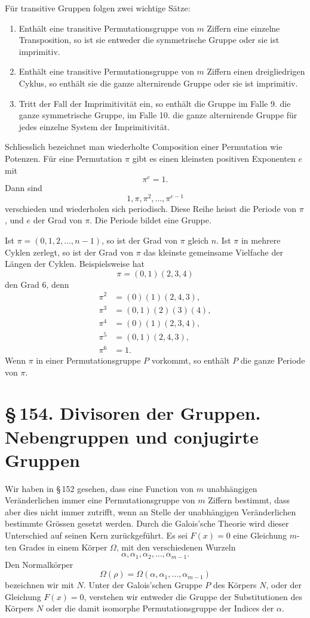 \documentclass[11pt]{article}
\providecommand{\sect}[2]{\section*{\S\,#1. #2}}
\begin{document}
Für transitive Gruppen folgen zwei wichtige Sätze:
\begin{enumerate}[label=\arabic*.,leftmargin=2em,start=9]
\item Enthält eine transitive Permutationsgruppe von $m$ Ziffern eine einzelne Transposition, so ist sie entweder die symmetrische Gruppe oder sie ist imprimitiv.
\item Enthält eine transitive Permutationsgruppe von $m$ Ziffern einen dreigliedrigen Cyklus, so enthält sie die ganze alternirende Gruppe oder sie ist imprimitiv.
\item Tritt der Fall der Imprimitivität ein, so enthält die Gruppe im Falle 9. die ganze symmetrische Gruppe, im Falle 10. die ganze alternirende Gruppe für jedes einzelne System der Imprimitivität.
\end{enumerate}

Schliesslich bezeichnet man wiederholte Composition einer Permutation wie Potenzen. Für eine Permutation $\pi$ gibt es einen kleinsten positiven Exponenten $e$ mit
\[
        \pi^e=1.
\]
Dann sind
\[
        1,\pi,\pi^2,
\ldots,\pi^{e-1}
\]
verschieden und wiederholen sich periodisch. Diese Reihe heisst die Periode von $\pi$, und $e$ der Grad von $\pi$. Die Periode bildet eine Gruppe.

Ist $\pi=(0,1,2,
\ldots,n-1)$, so ist der Grad von $\pi$ gleich $n$. Ist $\pi$ in mehrere Cyklen zerlegt, so ist der Grad von $\pi$ das kleinste gemeinsame Vielfache der Längen der Cyklen. Beispielsweise hat
\[
        \pi=(0,1)(2,3,4)
\]
den Grad $6$, denn
\[
\begin{aligned}
        \pi^2&=(0)(1)(2,4,3),\\
        \pi^3&=(0,1)(2)(3)(4),\\
        \pi^4&=(0)(1)(2,3,4),\\
        \pi^5&=(0,1)(2,4,3),\\
        \pi^6&=1.
\end{aligned}
\]
Wenn $\pi$ in einer Permutationsgruppe $P$ vorkommt, so enthält $P$ die ganze Periode von $\pi$.


\sect{154}{Divisoren der Gruppen. Nebengruppen und conjugirte Gruppen}

Wir haben in \S\,152 gesehen, dass eine Function von $m$ unabhängigen Veränderlichen immer eine Permutationsgruppe von $m$ Ziffern bestimmt, dass aber dies nicht immer zutrifft, wenn an Stelle der unabhängigen Veränderlichen bestimmte Grössen gesetzt werden. Durch die Galois'sche Theorie wird dieser Unterschied auf seinen Kern zurückgeführt. Es sei $F(x)=0$ eine Gleichung $m$-ten Grades in einem Körper $\Omega$, mit den verschiedenen Wurzeln
\[
        \alpha,\alpha_1,\alpha_2,\ldots,\alpha_{m-1}.
\]
Den Normalkörper
\[
        \Omega(\rho)=\Omega(\alpha,
\alpha_1,
\ldots,
\alpha_{m-1})
\]
bezeichnen wir mit $N$. Unter der Galois'schen Gruppe $P$ des Körpers $N$, oder der Gleichung $F(x)=0$, verstehen wir entweder die Gruppe der Substitutionen des Körpers $N$ oder die damit isomorphe Permutationsgruppe der Indices der $\alpha$.
\end{document}
